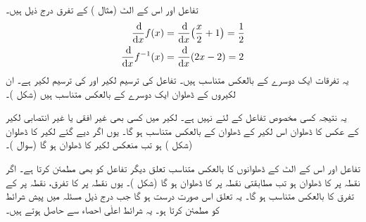 تفاعل   اور اس کے الٹ  (مثال ) کے تفرق درج ذیل ہیں۔
\begin{align*}
\frac{\dif}{\dif x}f(x)&=\frac{\dif}{\dif x}\big(\frac{x}{2}+1\big)=\frac{1}{2}\\
\frac{\dif}{\dif x}f^{-1}(x)&=\frac{\dif}{\dif x}(2x-2)=2
\end{align*}
یہ تفرقات ایک دوسرے کے بالعکس متناسب ہیں۔ تفاعل  کی ترسیم لکیر  اور  کی ترسیم لکیر  ہے۔ ان لکیروں کے ڈھلوان ایک دوسرے کے بالعکس متناسب ہیں (شکل )۔

یہ نتیجہ کسی مخصوص تفاعل کے لئے نہیں ہے۔ لکیر  میں کسی بھی غیر افقی یا غیر انتصابی لکیر کے عکس کا ڈھلوان اس لکیر کے ڈھلوان کے بالعکس متناسب ہو گا۔ یوں اگر دیے گئے لکیر کا ڈھلوان  (شکل ) ہو تب منعکس لکیر کا ڈھلوان  ہو گا (سوال )۔ 

تفاعل اور اس کے الٹ کے ڈھلوانوں  کا بالعکس متناسب تعلق دیگر تفاعل کو بھی مطمئن کرتا ہے۔ اگر نقطہ  پر  کا ڈھلوان  ہو تب مطابقتی نقطہ  پر  کا ڈھلوان  ہو گا (شکل )۔ یوں نقطہ  پر  کا تفرق، نقطہ  پر  کے تفرق کا بالعکس متناسب ہو گا۔ یہ تعلق اس صورت درست ہو گا جب  درج ذیل مسئلہ میں پیش   شرائط کو مطمئن کرتا ہو۔ یہ شرائط اعلٰی احصاء سے حاصل ہوتے ہیں۔ 

